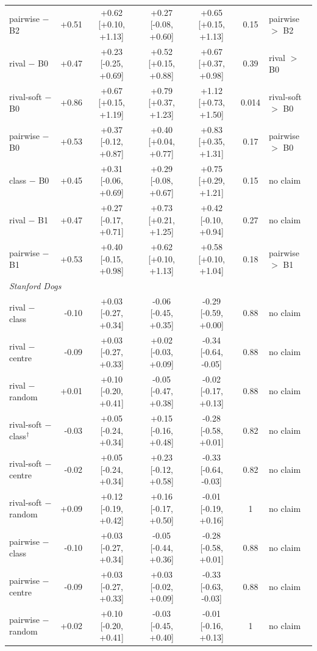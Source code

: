 \begin{tabular}{lrccccl}
pairwise $-$ B2 & +0.51 & +0.62 [+0.10, +1.13] & +0.27 [-0.08, +0.60] & +0.65 [+0.15, +1.13] & 0.15 & pairwise $>$ B2 \\
rival $-$ B0 & +0.47 & +0.23 [-0.25, +0.69] & +0.52 [+0.15, +0.88] & +0.67 [+0.37, +0.98] & 0.39 & rival $>$ B0 \\
rival-soft $-$ B0 & +0.86 & +0.67 [+0.15, +1.19] & +0.79 [+0.37, +1.23] & +1.12 [+0.73, +1.50] & 0.014 & rival-soft $>$ B0 \\
pairwise $-$ B0 & +0.53 & +0.37 [-0.12, +0.87] & +0.40 [+0.04, +0.77] & +0.83 [+0.35, +1.31] & 0.17 & pairwise $>$ B0 \\
class $-$ B0 & +0.45 & +0.31 [-0.06, +0.69] & +0.29 [-0.08, +0.67] & +0.75 [+0.29, +1.21] & 0.15 & no claim \\
rival $-$ B1 & +0.47 & +0.27 [-0.17, +0.71] & +0.73 [+0.21, +1.25] & +0.42 [-0.10, +0.94] & 0.27 & no claim \\
pairwise $-$ B1 & +0.53 & +0.40 [-0.15, +0.98] & +0.62 [+0.10, +1.13] & +0.58 [+0.10, +1.04] & 0.18 & pairwise $>$ B1 \\
\multicolumn{7}{l}{\emph{Stanford Dogs}} \\
rival $-$ class & -0.10 & +0.03 [-0.27, +0.34] & -0.06 [-0.45, +0.35] & -0.29 [-0.59, +0.00] & 0.88 & no claim \\
rival $-$ centre & -0.09 & +0.03 [-0.27, +0.33] & +0.02 [-0.03, +0.09] & -0.34 [-0.64, -0.05] & 0.88 & no claim \\
rival $-$ random & +0.01 & +0.10 [-0.20, +0.41] & -0.05 [-0.47, +0.38] & -0.02 [-0.17, +0.13] & 0.88 & no claim \\
rival-soft $-$ class$^\dagger$ & -0.03 & +0.05 [-0.24, +0.34] & +0.15 [-0.16, +0.48] & -0.28 [-0.58, +0.01] & 0.82 & no claim \\
rival-soft $-$ centre & -0.02 & +0.05 [-0.24, +0.34] & +0.23 [-0.12, +0.58] & -0.33 [-0.64, -0.03] & 0.82 & no claim \\
rival-soft $-$ random & +0.09 & +0.12 [-0.19, +0.42] & +0.16 [-0.17, +0.50] & -0.01 [-0.19, +0.16] & 1 & no claim \\
pairwise $-$ class & -0.10 & +0.03 [-0.27, +0.34] & -0.05 [-0.44, +0.36] & -0.28 [-0.58, +0.01] & 0.88 & no claim \\
pairwise $-$ centre & -0.09 & +0.03 [-0.27, +0.33] & +0.03 [-0.02, +0.09] & -0.33 [-0.63, -0.03] & 0.88 & no claim \\
pairwise $-$ random & +0.02 & +0.10 [-0.20, +0.41] & -0.03 [-0.45, +0.40] & -0.01 [-0.16, +0.13] & 1 & no claim \\

\end{tabular}
